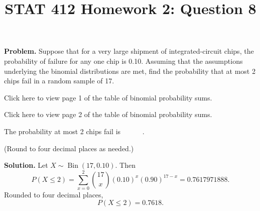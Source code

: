 \documentclass[11pt]{article}
\title{STAT 412 Homework 2: Question 8}
\author{}
\date{}
\begin{document}
\maketitle
\textbf{Problem.} Suppose that for a very large shipment of integrated-circuit
chips, the probability of failure for any one chip is 0.10. Assuming that the
assumptions underlying the binomial distributions are met, find the
probability that at most 2 chips fail in a random sample of 17.

Click here to view page 1 of the table of binomial probability sums.

Click here to view page 2 of the table of binomial probability sums.

The probability at most 2 chips fail is \(\boxed{\phantom{0.0000}}\).

(Round to four decimal places as needed.)

\textbf{Solution.} Let \(X\sim\operatorname{Bin}(17,0.10)\). Then
\[
P(X\le2)=\sum_{x=0}^{2}\binom{17}{x}(0.10)^x(0.90)^{17-x}
=0.7617971888.
\]
Rounded to four decimal places,
\[
\boxed{P(X\le2)=0.7618}.
\]
\end{document}
